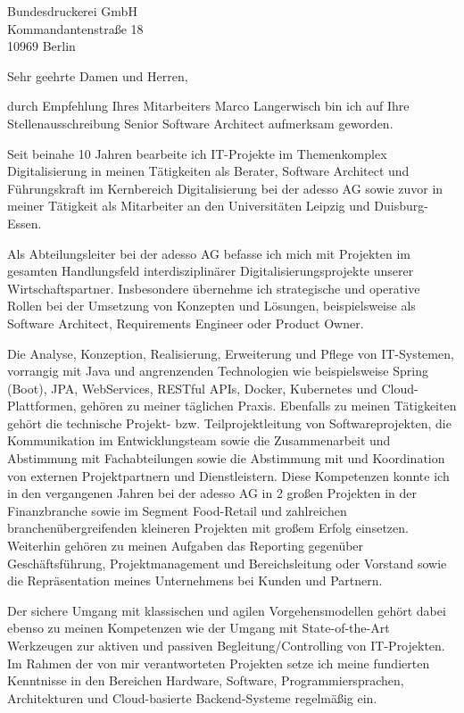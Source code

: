\documentclass[10pt,a4paper]{dinbrief}
\date{\today}
\begin{document}
 
\begin{letter}  
{%
	Bundesdruckerei GmbH\\
	Kommandantenstraße 18\\
	10969 Berlin
}
\subject{\bf Bewerbung Senior Software Architect}
\opening{Sehr geehrte Damen und Herren,}
durch Empfehlung Ihres Mitarbeiters Marco Langerwisch bin ich auf Ihre Stellenausschreibung Senior Software Architect aufmerksam geworden.

Seit beinahe 10 Jahren bearbeite ich IT-Projekte im Themenkomplex Digitalisierung in meinen Tätigkeiten als Berater, Software Architect und Führungskraft im Kernbereich Digitalisierung bei der adesso AG sowie zuvor in meiner Tätigkeit als Mitarbeiter an den Universitäten Leipzig und Duisburg-Essen. 

Als Abteilungsleiter bei der adesso AG befasse ich mich mit Projekten im gesamten Handlungsfeld interdisziplinärer Digitalisierungsprojekte unserer Wirtschaftspartner. Insbesondere übernehme ich strategische und operative Rollen bei der Umsetzung von Konzepten und Lösungen, beispielsweise als Software Architect, Requirements Engineer oder Product Owner. 

Die Analyse, Konzeption, Realisierung, Erweiterung und Pflege von IT-Systemen, vorrangig mit Java und angrenzenden Technologien wie beispielsweise Spring (Boot), JPA, WebServices, RESTful APIs, Docker, Kubernetes und Cloud-Plattformen, gehören zu meiner täglichen Praxis. Ebenfalls zu meinen Tätigkeiten gehört die technische Projekt- bzw. Teilprojektleitung von Softwareprojekten, die Kommunikation im Entwicklungsteam sowie die Zusammenarbeit und Abstimmung mit Fachabteilungen sowie die Abstimmung mit und Koordination von externen Projektpartnern und Dienstleistern. Diese Kompetenzen konnte ich in den vergangenen Jahren bei der adesso AG in 2 großen Projekten in der Finanzbranche sowie im Segment Food-Retail und zahlreichen branchenübergreifenden kleineren Projekten mit großem Erfolg einsetzen. Weiterhin gehören zu meinen Aufgaben das Reporting gegenüber Geschäftsführung, Projektmanagement und Bereichsleitung oder Vorstand sowie die Repräsentation meines Unternehmens bei Kunden und Partnern.

Der sichere Umgang mit klassischen und agilen Vorgehensmodellen gehört dabei ebenso zu meinen Kompetenzen wie der Umgang mit State-of-the-Art Werkzeugen zur aktiven und passiven Begleitung/Controlling von IT-Projekten. Im Rahmen der von mir verantworteten Projekten setze ich meine fundierten Kenntnisse in den Bereichen Hardware, Software, Programmiersprachen, Architekturen und Cloud-basierte Backend-Systeme regelmäßig ein.


\end{letter}
\end{document}

